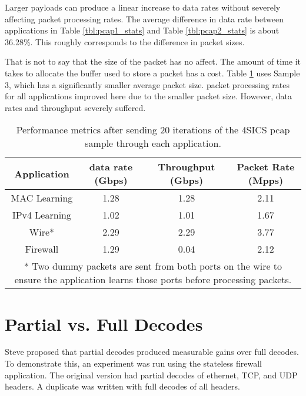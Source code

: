 Larger payloads can produce a linear increase to data rates without severely affecting packet processing rates. The average difference in data rate between applications in Table \ref{tbl:pcap1_stats} and Table \ref{tbl:pcap2_stats} is about 36.28\%. This roughly corresponds to the difference in packet sizes.

That is not to say that the size of the packet has no affect. The amount of time it takes to allocate the buffer used to store a packet has a cost. Table \ref{tbl:pcap3_stats} uses Sample 3, which has a significantly smaller average packet size. packet processing rates for all applications improved here due to the smaller packet size. However, data rates and throughput severely suffered.

\begin{table}[ht]
\caption{Performance metrics after sending 20 iterations of the 4SICS pcap sample through each application.}
\begin{center}
\begin{tabularx}{\linewidth}{| c || c | c | c | }
\hline
Application & data rate (Gbps) & Throughput (Gbps) & Packet Rate (Mpps) \\
\hline
MAC Learning & 1.28 & 1.28 & 2.11  \\
\hline
IPv4 Learning & 1.02 & 1.01 & 1.67  \\
\hline 
Wire* & 2.29 & 2.29 & 3.77 \\
\hline
Firewall & 1.29 & 0.04 & 2.12 \\
\hline
\multicolumn{4}{p{\linewidth}}{* Two dummy packets are sent from both ports on the wire to ensure the application learns those ports before processing packets.}
\end{tabularx}
\end{center}
\label{tbl:pcap3_stats}
\end{table}


\section{Partial vs. Full Decodes} \label{exp:decode_comparison}

Steve proposed that partial decodes produced measurable gains over full decodes. To demonstrate this, an experiment was run using the stateless firewall application. The original version had partial decodes of ethernet, TCP, and UDP headers. A duplicate was written with full decodes of all headers.

